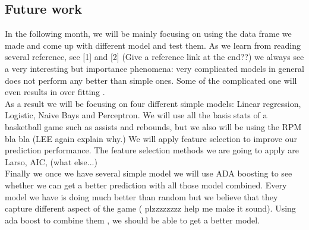 \documentclass[11pt]{article}
\begin{document}
\subsection{Future work}
In the following month, we will be mainly focusing on using the data frame we made and come up with different model and test them. 
As we learn from reading several reference, see [1] and [2] (Give a reference link at the end??) we always see a very interesting but importance phenomena:
very complicated models in general does not perform any better than simple ones. Some of the complicated one will even results in over fitting . \\
As a result we will be focusing on four different simple models: Linear regression, Logistic, Naive Bays and Perceptron.  We will use all the basis stats
of a basketball game such as assists and rebounds, but we also will be using the RPM bla bla (LEE again explain why.)
We will apply feature selection to improve our prediction performance. The feature selection methods we are going to apply are 
Larso, AIC,  (what else...)
\\
Finally we once we have several simple model we will use ADA boosting to see whether we can get a better prediction with all those model combined.
Every model we have is doing much better than random but we believe that  they capture different aspect of the game  ( plzzzzzzzz help me make it sound). Using ada boost to combine them , we should be able to 
get a better model. 


\end{document}
